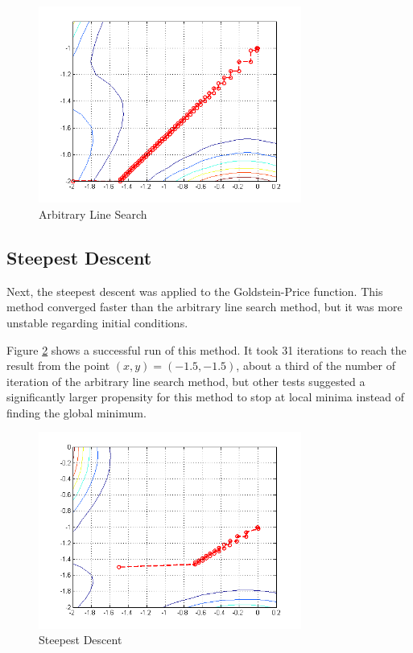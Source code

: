\documentclass[journal]{IEEEtran}
\begin{document}
\begin{figure}[H]
\centering
\includegraphics[width=3.4in]{figures/2d2-arbitraryLineSearch.png}
\caption{Arbitrary Line Search}
\label{figALS2}
\end{figure}

\subsection{Steepest Descent}

Next, the steepest descent was applied to the Goldstein-Price function. This method converged faster than the arbitrary line search method, but it was more unstable regarding initial conditions.

Figure \ref{figSD2} shows a successful run of this method. It took 31 iterations to reach the result from the point $(x,y) = (-1.5,-1.5)$, about a third of the number of iteration of the arbitrary line search method, but other tests suggested a significantly larger propensity for this method to stop at local minima instead of finding the global minimum.

\begin{figure}
\centering
\includegraphics[width=3.4in]{figures/2d2-steepestDescent.png}
\caption{Steepest Descent}
\label{figSD2}
\end{figure}
\end{document}
